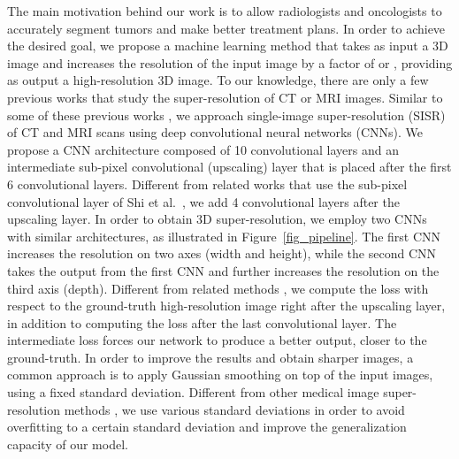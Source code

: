 \documentclass{ieeeaccess}
\begin{document}
The main motivation behind our work is to allow radiologists and oncologists to accurately segment tumors and make better treatment plans. In order to achieve the desired goal, we propose a machine learning method that takes as input a 3D image and increases the resolution of the input image by a factor of  or , providing as output a high-resolution 3D image. To our knowledge, there are only a few previous works \cite{Sert-MH-2019, Chen-MICCAI-2018, Du-AS-2019, Du-BIBM-2018, Du-NC-2019, Hatvani-TRPMS-2018, Hatvani-TMI-2018, Huang-CVPR-2017, Jurek-BBE-2019, Li-Access-2019, Mahapatra-CMIG-2019, Oktay-MICCAI-2016, Pham-CMIG-2019, Shi-JBHI-2018, You-TMI-2019, Yu-ICIP-2017, ZENG-CBM-2018, Zhao-TMI-2019} that study the super-resolution of CT or MRI images. Similar to some of these previous works \cite{Chen-MICCAI-2018, Du-AS-2019, Du-BIBM-2018, Du-NC-2019, Hatvani-TRPMS-2018, Hatvani-TMI-2018, Jurek-BBE-2019, Mahapatra-CMIG-2019, Oktay-MICCAI-2016, Pham-CMIG-2019, Shi-JBHI-2018, You-TMI-2019, Yu-ICIP-2017, ZENG-CBM-2018, Zhao-TMI-2019}, we approach single-image super-resolution (SISR) of CT and MRI scans using deep convolutional neural networks (CNNs). We propose a CNN architecture composed of 10 convolutional layers and an intermediate sub-pixel convolutional (upscaling) layer \cite{Shi-CVPR-2016} that is placed after the first 6 convolutional layers. Different from related works \cite{Du-AS-2019, Hatvani-TRPMS-2018, Yu-ICIP-2017, Zhao-TMI-2019} that use the sub-pixel convolutional layer of Shi et al.~\cite{Shi-CVPR-2016}, we add 4 convolutional layers after the upscaling layer. In order to obtain 3D super-resolution, we employ two CNNs with similar architectures, as illustrated in Figure~\ref{fig_pipeline}. The first CNN increases the resolution on two axes (width and height), while the second CNN takes the output from the first CNN and further increases the resolution on the third axis (depth). Different from related methods \cite{Du-AS-2019, Hatvani-TRPMS-2018, Yu-ICIP-2017, Zhao-TMI-2019}, we compute the loss with respect to the ground-truth high-resolution image right after the upscaling layer, in addition to computing the loss after the last convolutional layer. The intermediate loss forces our network to produce a better output, closer to the ground-truth. In order to improve the results and obtain sharper images, a common approach is to apply Gaussian smoothing on top of the input images, using a fixed standard deviation. Different from other medical image super-resolution methods \cite{Du-AS-2019, Shi-JBHI-2018, ZENG-CBM-2018}, we use various standard deviations in order to avoid overfitting to a certain standard deviation and improve the generalization capacity of our model.
\end{document}
